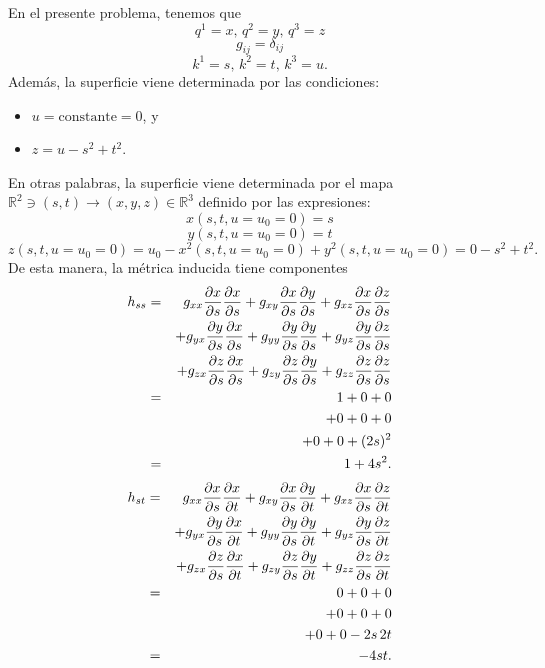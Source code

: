 \documentclass[aps,prl,twocolumn,groupedaddress]{revtex4-2}
\newcommand{\RR}{\mathbb{R}}
\begin{document}
En el presente problema, tenemos que
$$
q^1 = x,\, 
q^2 = y,\, 
q^3 = z
$$
$$
g_{ij} = \delta_{ij}
$$
$$
k^1 = s,\,
k^2 = t,\,
k^3 = u
.
$$
Además, la superficie viene determinada por las condiciones:
\begin{itemize}
\item  $u=\mathrm{constante}=0$, y
\item $z = u - s^2 + t^2.$
\end{itemize}
En otras palabras, la superficie viene determinada por el mapa $\RR^2\ni (s,t)\to (x,y,z)\in \RR^3$ definido por las expresiones:
$$
x(s,t,u=u_0=0) = s
$$
$$
y(s,t,u=u_0=0) = t
$$
$$
z(s,t,u=u_0=0) = u_0 - x^2(s,t,u=u_0=0) + y^2(s,t,u=u_0=0) = 0 - s^2 + t^2
.
$$
De esta manera, la métrica inducida tiene componentes
\begin{eqnarray}
h_{ss}
&=&
g_{xx}
\frac{\partial x}{\partial s}
\frac{\partial x}{\partial s}
+
g_{xy}
\frac{\partial x}{\partial s}
\frac{\partial y}{\partial s}
+
g_{xz}
\frac{\partial x}{\partial s}
\frac{\partial z}{\partial s}
\notag
\\
&&
+
g_{yx}
\frac{\partial y}{\partial s}
\frac{\partial x}{\partial s}
+
g_{yy}
\frac{\partial y}{\partial s}
\frac{\partial y}{\partial s}
+
g_{yz}
\frac{\partial y}{\partial s}
\frac{\partial z}{\partial s}
\notag
\\
&&
+
g_{zx}
\frac{\partial z}{\partial s}
\frac{\partial x}{\partial s}
+
g_{zy}
\frac{\partial z}{\partial s}
\frac{\partial y}{\partial s}
+
g_{zz}
\frac{\partial z}{\partial s}
\frac{\partial z}{\partial s}
\notag
\\
&=&
1 + 0 + 0 \notag\\
&&
+ 0 + 0 + 0 \notag\\
&&
+ 0 + 0 + (2s)^2
\notag
\\
&=&
1 + 4s^2.
\notag
\end{eqnarray}
\begin{eqnarray}
h_{st}
&=&
g_{xx}
\frac{\partial x}{\partial s}
\frac{\partial x}{\partial t}
+
g_{xy}
\frac{\partial x}{\partial s}
\frac{\partial y}{\partial t}
+
g_{xz}
\frac{\partial x}{\partial s}
\frac{\partial z}{\partial t}
\notag
\\
&&
+
g_{yx}
\frac{\partial y}{\partial s}
\frac{\partial x}{\partial t}
+
g_{yy}
\frac{\partial y}{\partial s}
\frac{\partial y}{\partial t}
+
g_{yz}
\frac{\partial y}{\partial s}
\frac{\partial z}{\partial t}
\notag
\\
&&
+
g_{zx}
\frac{\partial z}{\partial s}
\frac{\partial x}{\partial t}
+
g_{zy}
\frac{\partial z}{\partial s}
\frac{\partial y}{\partial t}
+
g_{zz}
\frac{\partial z}{\partial s}
\frac{\partial z}{\partial t}
\notag
\\
&=&
0 + 0 + 0 \notag\\
&&
+ 0 + 0 + 0 \notag\\
&&
+ 0 + 0 - 2s \, 2t
\notag
\\
&=&
-4st.
\notag
\end{eqnarray}
\end{document}

